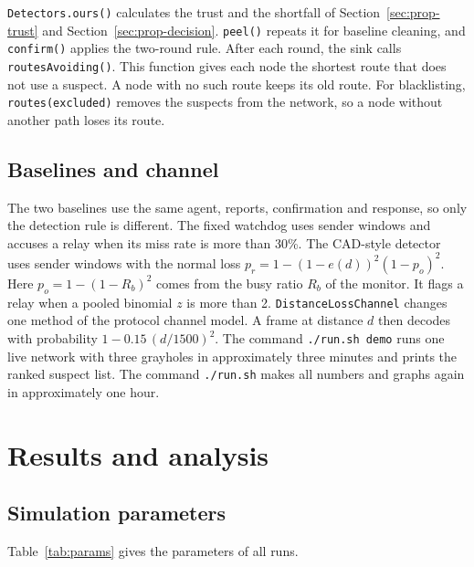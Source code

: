 \documentclass[11pt]{article}
\begin{document}
\texttt{Detectors.ours()} calculates the trust and the shortfall of Section~\ref{sec:prop-trust} and Section~\ref{sec:prop-decision}.
\texttt{peel()} repeats it for baseline cleaning, and \texttt{confirm()} applies the two-round rule.
After each round, the sink calls \texttt{routesAvoiding()}.
This function gives each node the shortest route that does not use a suspect.
A node with no such route keeps its old route.
For blacklisting, \texttt{routes(excluded)} removes the suspects from the network, so a node without another path loses its route.

\subsection{Baselines and channel}\label{sec:impl-baselines}
\noindent
The two baselines use the same agent, reports, confirmation and response, so only the detection rule is different.
The fixed watchdog uses sender windows and accuses a relay when its miss rate is more than 30\%.
The CAD-style detector uses sender windows with the normal loss $p_r = 1-(1-e(d))^2(1-p_o)^2$.
Here $p_o = 1-(1-R_b)^2$ comes from the busy ratio $R_b$ of the monitor.
It flags a relay when a pooled binomial $z$ is more than 2.
\texttt{DistanceLossChannel} changes one method of the protocol channel model.
A frame at distance $d$ then decodes with probability $1-0.15\,(d/1500)^2$.
The command \texttt{./run.sh demo} runs one live network with three grayholes in approximately three minutes and prints the ranked suspect list.
The command \texttt{./run.sh} makes all numbers and graphs again in approximately one hour.

\section{Results and analysis}\label{sec:results}

\subsection{Simulation parameters}\label{sec:res-params}
\noindent
Table~\ref{tab:params} gives the parameters of all runs.
\end{document}
